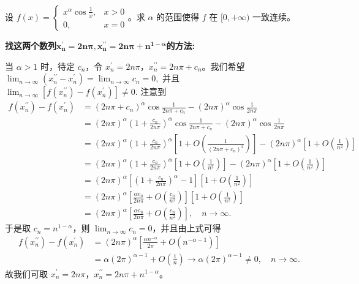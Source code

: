 \documentclass[lang=cn,newtx,10pt,scheme=chinese]{elegantbook}
\begin{document}
\begin{example}
设 \( f(x) = \begin{cases} 
x^\alpha \cos \frac{1}{x}, & x > 0 \\ 
0, & x = 0 
\end{cases} \)。求 \(\alpha\) 的范围使得 \(f\) 在 \([0, +\infty)\) 一致连续。
\end{example}
\begin{note}
\hypertarget{找两个数列的方式123}{\textbf{找这两个数列$\boldsymbol{x}_{\boldsymbol{n}}^{\prime}=\mathbf{2}\boldsymbol{n\pi },\boldsymbol{x}_{\boldsymbol{n}}^{\prime\prime}=\mathbf{2}\boldsymbol{n\pi }+\boldsymbol{n}^{\mathbf{1}-\boldsymbol{\alpha }}$的方法:}}
当 $\alpha > 1$ 时，待定 $c_n$，令 $x_{n}^{\prime} = 2n\pi$，$x_{n}^{\prime\prime} = 2n\pi + c_n$。我们希望
\(
\lim_{n \rightarrow \infty} \left( x_{n}^{\prime\prime} - x_{n}^{\prime} \right) = \lim_{n \rightarrow \infty} c_n = 0,
\)
并且
\(
\lim_{n \rightarrow \infty} \left[ f\left( x_{n}^{\prime\prime} \right) - f\left( x_{n}^{\prime} \right) \right] \ne 0.
\)
注意到
\begin{align*}
f\left( x_{n}^{\prime\prime} \right) - f\left( x_{n}^{\prime} \right) &= \left( 2n\pi + c_n \right)^{\alpha} \cos \frac{1}{2n\pi + c_n} - \left( 2n\pi \right)^{\alpha} \cos \frac{1}{2n\pi} \\
&= \left( 2n\pi \right)^{\alpha} \left( 1 + \frac{c_n}{2n\pi} \right)^{\alpha} \cos \frac{1}{2n\pi + c_n} - \left( 2n\pi \right)^{\alpha} \cos \frac{1}{2n\pi} \\
&= \left( 2n\pi \right)^{\alpha} \left( 1 + \frac{c_n}{2n\pi} \right)^{\alpha} \left[ 1 + O\left( \frac{1}{\left( 2n\pi + c_n \right)^2} \right) \right] - \left( 2n\pi \right)^{\alpha} \left[ 1 + O\left( \frac{1}{n^2} \right) \right] \\
&= \left( 2n\pi \right)^{\alpha} \left( 1 + \frac{c_n}{2n\pi} \right)^{\alpha} \left[ 1 + O\left( \frac{1}{n^2} \right) \right] - \left( 2n\pi \right)^{\alpha} \left[ 1 + O\left( \frac{1}{n^2} \right) \right] \\
&= \left( 2n\pi \right)^{\alpha} \left[ \left( 1 + \frac{c_n}{2n\pi} \right)^{\alpha} - 1 \right] \left[ 1 + O\left( \frac{1}{n^2} \right) \right] \\
&= \left( 2n\pi \right)^{\alpha} \left[ \frac{\alpha c_n}{2n\pi} + O\left( \frac{c_n}{n^2} \right) \right] \left[ 1 + O\left( \frac{1}{n^2} \right) \right] \\
&= \left( 2n\pi \right)^{\alpha} \left[ \frac{\alpha c_n}{2n\pi} + O\left( \frac{c_n}{n^2} \right) \right], \quad n \rightarrow \infty.
\end{align*}
于是取 $c_n = n^{1 - \alpha}$，则 $\lim_{n \rightarrow \infty} c_n = 0$，并且由上式可得
\begin{align*}
f\left( x_{n}^{\prime\prime} \right) - f\left( x_{n}^{\prime} \right) &= \left( 2n\pi \right)^{\alpha} \left[ \frac{\alpha n^{-\alpha}}{2\pi} + O\left( n^{-\alpha - 1} \right) \right] \\
&= \alpha \left( 2\pi \right)^{\alpha - 1} + O\left( \frac{1}{n} \right) \rightarrow \alpha \left( 2\pi \right)^{\alpha - 1} \ne 0, \quad n \rightarrow \infty.
\end{align*}
故我们可取 $x_{n}^{\prime} = 2n\pi$，$x_{n}^{\prime\prime} = 2n\pi + n^{1 - \alpha}$。
\end{note}
\end{document}
